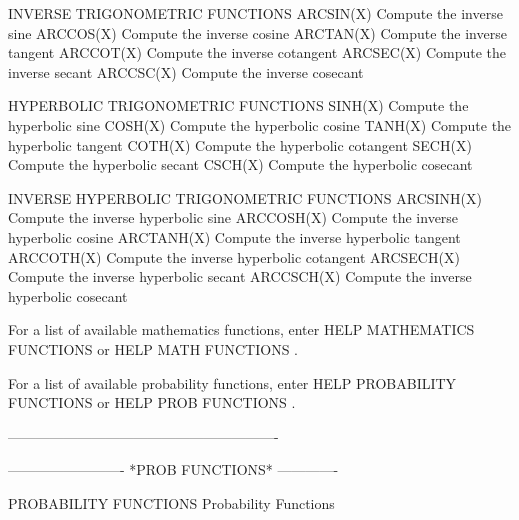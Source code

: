 INVERSE TRIGONOMETRIC FUNCTIONS
   ARCSIN(X)     Compute the inverse sine
   ARCCOS(X)     Compute the inverse cosine
   ARCTAN(X)     Compute the inverse tangent
   ARCCOT(X)     Compute the inverse cotangent
   ARCSEC(X)     Compute the inverse secant
   ARCCSC(X)     Compute the inverse cosecant
 
HYPERBOLIC TRIGONOMETRIC FUNCTIONS
   SINH(X)       Compute the hyperbolic sine
   COSH(X)       Compute the hyperbolic cosine
   TANH(X)       Compute the hyperbolic tangent
   COTH(X)       Compute the hyperbolic cotangent
   SECH(X)       Compute the hyperbolic secant
   CSCH(X)       Compute the hyperbolic cosecant
 
INVERSE HYPERBOLIC TRIGONOMETRIC FUNCTIONS
   ARCSINH(X)    Compute the inverse hyperbolic sine
   ARCCOSH(X)    Compute the inverse hyperbolic cosine
   ARCTANH(X)    Compute the inverse hyperbolic tangent
   ARCCOTH(X)    Compute the inverse hyperbolic cotangent
   ARCSECH(X)    Compute the inverse hyperbolic secant
   ARCCSCH(X)    Compute the inverse hyperbolic cosecant
 
For a list of available mathematics functions, enter HELP MATHEMATICS
FUNCTIONS or HELP MATH FUNCTIONS   .
 
For a list of available probability functions, enter HELP PROBABILITY
FUNCTIONS or HELP PROB FUNCTIONS   .
 
----------------------------------------------------------
 
 
 
 
 
 
 
 
 
 
 
 
 
 
 
 
 
 
 
 
 
 
 
 
 
 
 
 
 
 
 
 
 
 
 
 
 
 
 
 
 
 
 
 
 
-------------------------  *PROB FUNCTIONS*  -------------
 
PROBABILITY FUNCTIONS
Probability Functions
 
